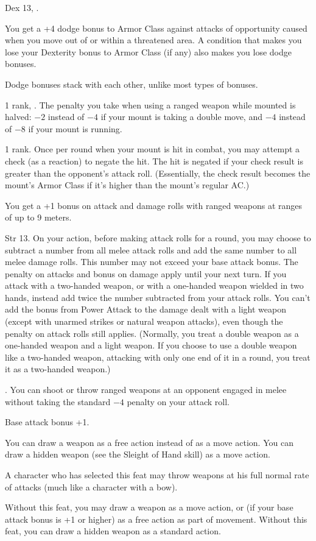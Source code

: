 {Dex 13, .}
{You get a +4 dodge bonus to Armor Class against attacks of opportunity caused when you move out of or within a threatened area. A condition that makes you lose your Dexterity bonus to Armor Class (if any) also makes you lose dodge bonuses.

Dodge bonuses stack with each other, unlike most types of bonuses.}

{ 1 rank, .}
{The penalty you take when using a ranged weapon while mounted is halved: $-2$ instead of $-4$ if your mount is taking a double move, and $-4$ instead of $-8$ if your mount is running.}

{ 1 rank.}
{Once per round when your mount is hit in combat, you may attempt a  check (as a reaction) to negate the hit. The hit is negated if your  check result is greater than the opponent's attack roll. (Essentially, the  check result becomes the mount's Armor Class if it's higher than the mount's regular AC.)}

{}
{You get a +1 bonus on attack and damage rolls with ranged weapons at ranges of up to 9 meters.}

{}
{Str 13.}
{On your action, before making attack rolls for a round, you may choose to subtract a number from all melee attack rolls and add the same number to all melee damage rolls. This number may not exceed your base attack bonus. The penalty on attacks and bonus on damage apply until your next turn.}
{If you attack with a two-handed weapon, or with a one-handed weapon wielded in two hands, instead add twice the number subtracted from your attack rolls. You can't add the bonus from Power Attack to the damage dealt with a light weapon (except with unarmed strikes or natural weapon attacks), even though the penalty on attack rolls still applies. (Normally, you treat a double weapon as a one-handed weapon and a light weapon. If you choose to use a double weapon like a two-handed weapon, attacking with only one end of it in a round, you treat it as a two-handed weapon.)}{}

{.}
{You can shoot or throw ranged weapons at an opponent engaged in melee without taking the standard $-4$ penalty on your attack roll.}

{}
{Base attack bonus +1.}
{You can draw a weapon as a free action instead of as a move action. You can draw a hidden weapon (see the Sleight of Hand skill) as a move action.

A character who has selected this feat may throw weapons at his full normal rate of attacks (much like a character with a bow).}
{Without this feat, you may draw a weapon as a move action, or (if your base attack bonus is +1 or higher) as a free action as part of movement. Without this feat, you can draw a hidden weapon as a standard action.}{}

